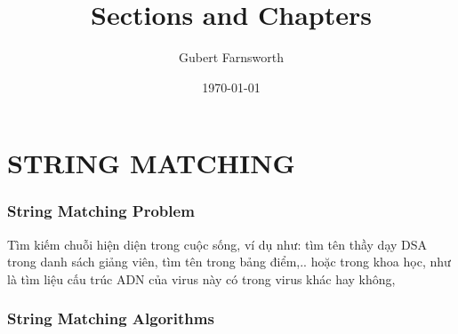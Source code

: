 \documentclass[a4paper,11pt]{article}
\title{Sections and Chapters}
\author{Gubert Farnsworth}
\date{\today}
\begin{document}
	\maketitle
	\part*{STRING MATCHING}
	
	\section{String Matching Problem}
	Tìm kiếm chuỗi hiện diện trong cuộc sống, ví dụ như: tìm tên thầy dạy DSA trong danh sách giảng viên,
	tìm tên trong bảng điểm,.. hoặc trong khoa học, như là tìm liệu cấu trúc ADN của virus này có trong virus khác hay không,

	\section{String Matching Algorithms}
\end{document}
